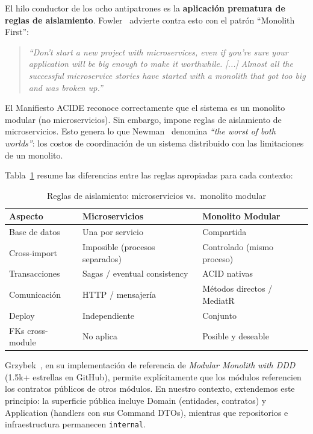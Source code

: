 \documentclass[conference]{IEEEtran}
\begin{document}
El hilo conductor de los ocho antipatrones es la \textbf{aplicaci\'on prematura de reglas de aislamiento}. Fowler~\cite{fowler2015} advierte contra esto con el patr\'on ``Monolith First'':

\begin{quote}
\textit{``Don't start a new project with microservices, even if you're sure your application will be big enough to make it worthwhile. [...] Almost all the successful microservice stories have started with a monolith that got too big and was broken up.''}
\end{quote}

El Manifiesto ACIDE reconoce correctamente que el sistema es un monolito modular (no microservicios). Sin embargo, impone reglas de aislamiento de microservicios. Esto genera lo que Newman~\cite{newman2019} denomina \textit{``the worst of both worlds''}: los costos de coordinaci\'on de un sistema distribuido con las limitaciones de un monolito.

Tabla~\ref{tab:comparacion} resume las diferencias entre las reglas apropiadas para cada contexto:

\begin{table}[htbp]
\centering
\caption{Reglas de aislamiento: microservicios vs.\ monolito modular}
\label{tab:comparacion}
\small
\begin{tabular}{p{2cm}p{2.8cm}p{2.8cm}}
\toprule
\textbf{Aspecto} & \textbf{Microservicios} & \textbf{Monolito Modular} \\
\midrule
Base de datos & Una por servicio & Compartida \\
Cross-import & Imposible (procesos separados) & Controlado (mismo proceso) \\
Transacciones & Sagas / eventual consistency & ACID nativas \\
Comunicaci\'on & HTTP / mensajer\'ia & M\'etodos directos / MediatR \\
Deploy & Independiente & Conjunto \\
FKs cross-module & No aplica & Posible y deseable \\
\bottomrule
\end{tabular}
\end{table}

Grzybek~\cite{grzybek2019}, en su implementaci\'on de referencia de \textit{Modular Monolith with DDD} (1.5k+ estrellas en GitHub), permite expl\'icitamente que los m\'odulos referencien los contratos p\'ublicos de otros m\'odulos. En nuestro contexto, extendemos este principio: la superficie p\'ublica incluye Domain (entidades, contratos) y Application (handlers con sus Command DTOs), mientras que repositorios e infraestructura permanecen \texttt{internal}.
\end{document}
